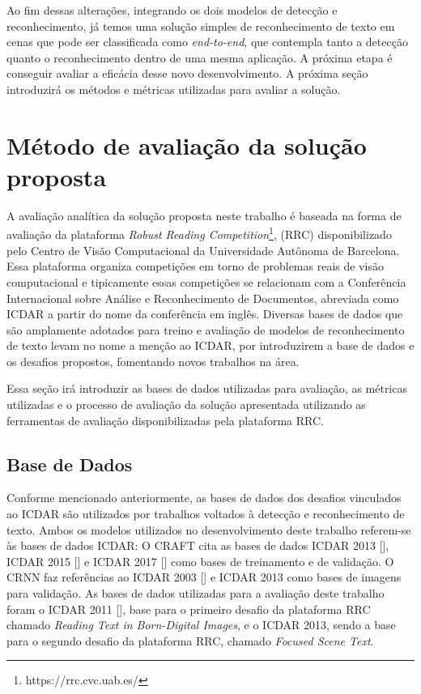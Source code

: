 Ao fim dessas alterações, integrando os dois modelos de detecção e reconhecimento, já temos uma solução simples de reconhecimento de texto em cenas 
que pode ser classificada como \textit{end-to-end}, que contempla tanto a detecção quanto o reconhecimento dentro de uma mesma aplicação. A próxima 
etapa é conseguir avaliar a eficácia desse novo desenvolvimento. A próxima seção introduzirá os métodos e métricas utilizadas para avaliar a solução.

\section{Método de avaliação da solução proposta}\label{sec:methodology_validation}

A avaliação analítica da solução proposta neste trabalho é baseada na forma de avaliação da plataforma \textit{Robust Reading Competition}\footnote{https://rrc.cvc.uab.es/}, 
(RRC) disponibilizado pelo Centro de Visão Computacional da Universidade Autônoma de Barcelona. Essa plataforma organiza competições em torno de 
problemas reais de visão computacional e tipicamente essas competições se relacionam com a Conferência Internacional sobre Análise e Reconhecimento 
de Documentos, abreviada como ICDAR a partir do nome da conferência em inglês. Diversas bases de dados que são amplamente adotados para 
treino e avaliação de modelos de reconhecimento de texto levam no nome a menção ao ICDAR, por introduzirem a base de dados e os desafios 
propostos, fomentando novos trabalhos na área.

Essa seção irá introduzir as bases de dados utilizadas para avaliação, as métricas utilizadas e o processo de avaliação da solução apresentada 
utilizando as ferramentas de avaliação disponibilizadas pela plataforma RRC.

\subsection{Base de Dados}\label{sec:methodology_datasets}

Conforme mencionado anteriormente, as bases de dados dos desafios vinculados ao ICDAR são utilizados por trabalhos voltados à detecção e 
reconhecimento de texto. Ambos os modelos utilizados no desenvolvimento deste trabalho referem-se às bases de dados ICDAR: O CRAFT cita as bases 
de dados ICDAR 2013 [], ICDAR 2015 [] e ICDAR 2017 [] como bases de treinamento 
e de validação. O CRNN faz referências ao ICDAR 2003 [] e ICDAR 2013 como bases de imagens para validação. As bases de 
dados utilizadas para a avaliação deste trabalho foram o ICDAR 2011 [], base para o primeiro desafio da plataforma RRC 
chamado \textit{Reading Text in Born-Digital Images}, e o ICDAR 2013, sendo a base para o segundo desafio da plataforma RRC, chamado \textit{Focused Scene Text}.

